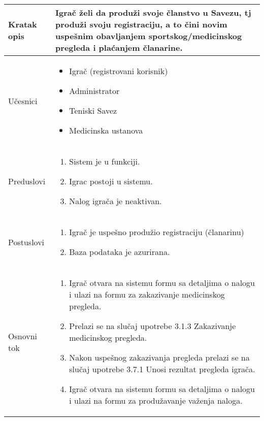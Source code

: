 \documentclass{article}
\begin{document}
       \begin{longtable}{| p{} | p{} |} 
            \hline
                Kratak opis & Igrač želi da produži svoje članstvo u Savezu, tj produži svoju registraciju, a to čini novim uspešnim obavljanjem sportskog/medicinskog pregleda i plaćanjem članarine.\\ 
            \hline    
                Učesnici & \begin{itemize}
                    \item Igrač (registrovani korisnik)
                    \item Administrator
                    \item Teniski Savez
                    \item Medicinska ustanova
                \end{itemize} \\
            \hline
               Preduslovi & \begin{enumerate}
                   \item Sistem je u funkciji.
                   \item Igrac postoji u sistemu.
                   \item Nalog igrača je neaktivan.
               \end{enumerate}\\
            \hline  
                Postuslovi & \begin{enumerate}
                    \item Igrač je uspešno produžio registraciju (članarinu)
                    \item Baza podataka je azurirana.
                \end{enumerate}\\
            \hline
                Osnovni tok & \begin{enumerate}
                    \item Igrač otvara na sistemu formu sa detaljima o nalogu i ulazi na formu za zakazivanje medicinskog pregleda.
                    \item Prelazi se na slučaj upotrebe 3.1.3 Zakazivanje medicinskog pregleda.
                    \item Nakon uspešnog zakazivanja pregleda prelazi se na slučaj upotrebe 3.7.1 Unosi rezultat pregleda igrača.
                    \item Igrač otvara na sistemu formu sa detaljima o nalogu i ulazi na formu za produžavanje važenja naloga.

\end{enumerate}
\end{longtable}
\end{document}
